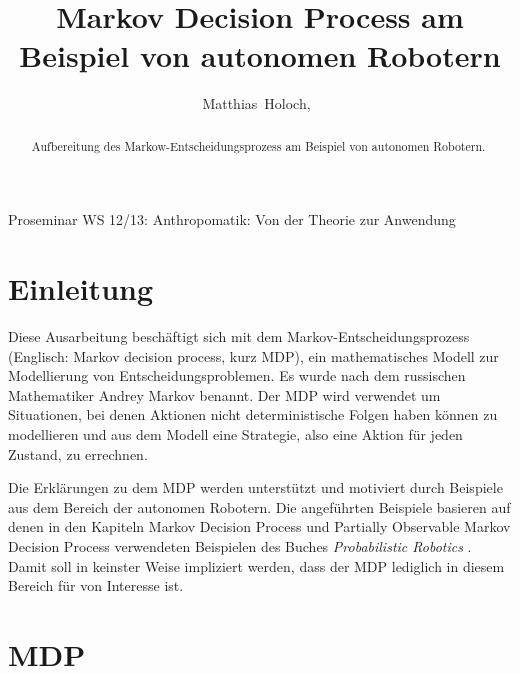 \documentclass[a4paper]{IEEEtran}
\begin{document}
\title{Markov Decision Process am Beispiel von autonomen Robotern} %

\author{Matthias~Holoch,~}%




%
{Proseminar WS 12/13: Anthropomatik: Von der Theorie zur Anwendung}



\maketitle


\begin{abstract}
Aufbereitung des Markow-Entscheidungsprozess am Beispiel von autonomen Robotern. 
\end{abstract}


\section{Einleitung}
Diese Ausarbeitung beschäftigt sich mit dem Markov-Entscheidungsprozess (Englisch: Markov decision process, kurz MDP), ein mathematisches Modell zur Modellierung von Entscheidungsproblemen. Es wurde nach dem russischen Mathematiker Andrey Markov benannt. Der MDP wird verwendet um Situationen, bei denen Aktionen nicht deterministische Folgen haben können zu modellieren und aus dem Modell eine Strategie, also eine Aktion für jeden Zustand, zu errechnen.

Die Erklärungen zu dem MDP werden unterstützt und motiviert durch Beispiele aus dem Bereich der autonomen Robotern. Die angeführten Beispiele basieren auf denen in den Kapiteln Markov Decision Process und Partially Observable Markov Decision Process verwendeten Beispielen des Buches \emph{Probabilistic Robotics} \cite{thrun2005probabilistic}. Damit soll in keinster Weise impliziert werden, dass der MDP lediglich in diesem Bereich für von Interesse ist.


\section{MDP}
\end{document}
